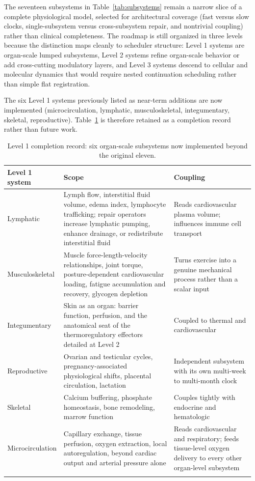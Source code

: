 \documentclass[11pt]{article}
\begin{document}
The seventeen subsystems in Table~\ref{tab:subsystems} remain a narrow slice of a complete physiological model, selected for architectural coverage (fast versus slow clocks, single-subsystem versus cross-subsystem repair, and nontrivial coupling) rather than clinical completeness. The roadmap is still organized in three levels because the distinction maps cleanly to scheduler structure: Level 1 systems are organ-scale lumped subsystems, Level 2 systems refine organ-scale behavior or add cross-cutting modulatory layers, and Level 3 systems descend to cellular and molecular dynamics that would require nested continuation scheduling rather than simple flat registration.

The six Level 1 systems previously listed as near-term additions are now implemented (microcirculation, lymphatic, musculoskeletal, integumentary, skeletal, reproductive). Table~\ref{tab:roadmap-l1} is therefore retained as a completion record rather than future work.

\begin{longtable}{@{}p{2.6cm}p{7.3cm}p{2.8cm}@{}}
\toprule
Level 1 system & Scope & Coupling \\
\midrule
\endhead
Lymphatic & Lymph flow, interstitial fluid volume, edema index, lymphocyte trafficking; repair operators increase lymphatic pumping, enhance drainage, or redistribute interstitial fluid & Reads cardiovascular plasma volume; influences immune cell transport \\
Musculoskeletal & Muscle force-length-velocity relationships, joint torque, posture-dependent cardiovascular loading, fatigue accumulation and recovery, glycogen depletion & Turns exercise into a genuine mechanical process rather than a scalar input \\
Integumentary & Skin as an organ: barrier function, perfusion, and the anatomical seat of the thermoregulatory effectors detailed at Level 2 & Coupled to thermal and cardiovascular \\
Reproductive & Ovarian and testicular cycles, pregnancy-associated physiological shifts, placental circulation, lactation & Independent subsystem with its own multi-week to multi-month clock \\
Skeletal & Calcium buffering, phosphate homeostasis, bone remodeling, marrow function & Couples tightly with endocrine and hematologic \\
Microcirculation & Capillary exchange, tissue perfusion, oxygen extraction, local autoregulation, beyond cardiac output and arterial pressure alone & Reads cardiovascular and respiratory; feeds tissue-level oxygen delivery to every other organ-level subsystem \\
\bottomrule
\caption{Level 1 completion record: six organ-scale subsystems now implemented beyond the original eleven.}
\label{tab:roadmap-l1}
\end{longtable}
\end{document}
